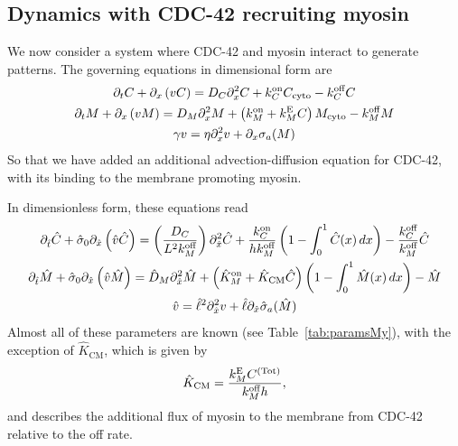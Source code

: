 \documentclass[11pt]{article}
\newcommand{\6}[1]{#1_{\text{6}}}
\newcommand{\3}[1]{#1_{\text{3}}}
\newcommand{\Tot}[1]{#1^\text{(Tot)}}
\newcommand{\C}[1]{#1_C}
\newcommand{\My}[1]{#1_M}
\begin{document}
\subsection{Dynamics with CDC-42 recruiting myosin \label{sec:CDC42}}
We now consider a system where CDC-42 and myosin interact to generate patterns. The governing equations in dimensional form are 
\begin{subequations}
\label{eq:MyCDC}
\begin{gather}
\Dt C + \Dx \left(v C\right) = D_C \Dx^2 C +\C{\kon}C_\text{cyto} - \C{\koff} C \\
\Dt M + \Dx \left(v M\right) = D_M \Dx^2 M +\left(\My{\kon}+\My{\kE}C\right)M_\text{cyto} - \My{\koff} M \\
\gamma v = \eta \Dx^2 v + \Dx \sigma_a(M)
\end{gather}
\end{subequations}
So that we have added an additional advection-diffusion equation for CDC-42, with its binding to the membrane promoting myosin.

In dimensionless form, these equations read 
\begin{subequations}
\label{eq:MyCDC}
\begin{gather}
\Dthat \hat{C} +\hat{\sigma}_0  \Dxhat \left(\hat{v} \hat{C} \right) =\left(\frac{\C{D}}{L^2 \My{\koff}}\right) \Dxhat^2 \hat{C}+\frac{\C{\kon}}{h \My{\koff}}\left(1-\int_0^1  \hat{C}(x) \, dx\right)-\frac{\C{\koff}}{\My{\koff}} \hat{C}\\
\Dthat \hat{M} +\hat{\sigma}_0  \Dxhat \left(\hat{v} \hat{M} \right) =\hat{D}_M \Dxhat^2 \hat{M} +\left(\hat{K}^\text{on}_M+\hat{K}_\text{CM} \hat{C}\right) \left(1-\int_0^1  \hat{M}(x) \, dx\right) - \hat{M}\\
\label{eq:MVND}
\hat{v} = \hat{\ell}^2 \Dxhat^2 v +\hat{\ell} \Dxhat \hat{\sigma}_a(\hat{M})
\end{gather}
\end{subequations}
Almost all of these parameters are known (see Table\ \ref{tab:paramsMy}), with the exception of $\hat{K}_\text{CM}$, which is given by
\begin{equation}
\hat{K}_\text{CM} = \frac{\My{\kE}\Tot{C}}{\My{\koff}h},
\end{equation}
and describes the additional flux of myosin to the membrane from CDC-42 relative to the off rate.
\end{document}
